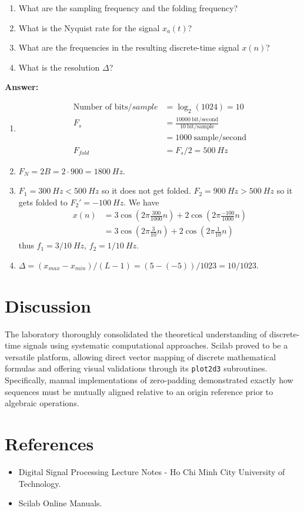 \documentclass[12pt,a4paper]{article}
\begin{document}
\begin{enumerate}[label=\textbf{(\alph*)}, leftmargin=*]
    \item What are the sampling frequency and the folding frequency?
    \item What is the Nyquist rate for the signal $x_a(t)$?
    \item What are the frequencies in the resulting discrete-time signal $x(n)$?
    \item What is the resolution $\Delta$?
\end{enumerate}

\noindent\textbf{Answer:}

\begin{enumerate}[label=\textbf{(\alph*)}, leftmargin=*]
    \item 
    \begin{align*}
        \text{Number of bits}/sample &= \log_2(1024) = 10\\
        F_s &= \frac{10000\: \text{bit/second}}{10 \:\text{bit/sample}}\\
        &= 1000\:\text{sample/second}\\
        F_{fold} &= F_s/2 = 500\: Hz   
    \end{align*}
    \item $F_N = 2B = 2\cdot 900 = 1800\: Hz$.
    \item $F_1 = 300\: Hz < 500\: Hz$ so it does not get folded. $F_2= 900\: Hz > 500\:Hz$ so it gets folded to $F_2' = -100\: Hz$.
    We have
    \begin{align*}
        x(n) &= 3\cos(2\pi\frac{300}{1000}n) + 2\cos(2\pi\frac{-100}{1000}n)\\
        &= 3\cos(2\pi\frac{3}{10}n) + 2\cos(2\pi\frac{1}{10}n)
    \end{align*}
    thus $f_1 = 3/10\: Hz$, $f_2=1/10\: Hz$.
    \item $\Delta = (x_{max}-x_{min})/(L-1)= (5-(-5))/1023 = 10/1023$.
\end{enumerate}

\section{Discussion}
The laboratory thoroughly consolidated the theoretical understanding of discrete-time signals using systematic computational approaches. Scilab proved to be a versatile platform, allowing direct vector mapping of discrete mathematical formulas and offering visual validations through its \texttt{plot2d3} subroutines. Specifically, manual implementations of zero-padding demonstrated exactly how sequences must be mutually aligned relative to an origin reference prior to algebraic operations.

\section{References}
\begin{itemize}
    \item Digital Signal Processing Lecture Notes - Ho Chi Minh City University of Technology.
    \item Scilab Online Manuals.
\end{itemize}
\end{document}
